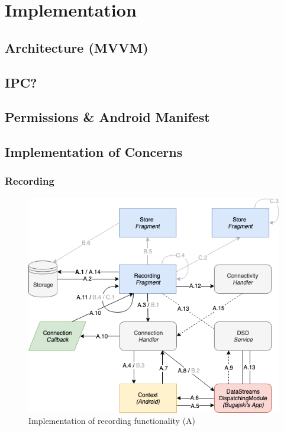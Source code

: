\chapter{Implementation}

\section{Architecture (MVVM)}
\section{IPC?}
\section{Permissions \& Android Manifest}

\section{Implementation of Concerns}

\subsection{Recording}
\begin{figure}
    \centering
    \includegraphics[scale=0.6]{images/Recording_ImpA.png}
    \caption{Implementation of recording functionality (A)}
    \label{fig:impl_recordingA}
\end{figure}

